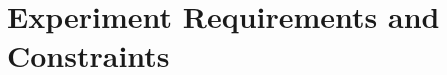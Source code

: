 \pagebreak
\section{Experiment Requirements and Constraints}


\pagebreak

\pagebreak

\pagebreak

\pagebreak


